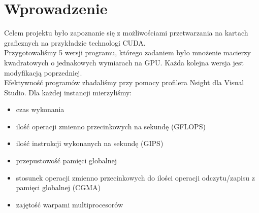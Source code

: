
\section{Wprowadzenie}

Celem projektu było zapoznanie się z możliwościami przetwarzania na kartach graficznych na przykładzie technologi CUDA. \\

Przygotowaliśmy 5 wersji programu, którego zadaniem było mnożenie macierzy kwadratowych o jednakowych wymiarach na GPU. Każda kolejna wersja jest modyfikacją poprzedniej. \\

Efektywność programów zbadaliśmy przy pomocy profilera Nsight dla Visual Studio. Dla każdej instancji mierzyliśmy:
\begin{itemize}
\item czas wykonania
\item ilość operacji zmienno przecinkowych na sekundę (GFLOPS)
\item ilość instrukcji wykonanych na sekundę (GIPS)
\item przepustowość pamięci globalnej
\item stosunek operacji zmienno przecinkowych do ilości operacji odczytu/zapisu z pamięci globalnej (CGMA)
\item zajętość warpami multiprocesorów
\end{itemize}

\newpage
